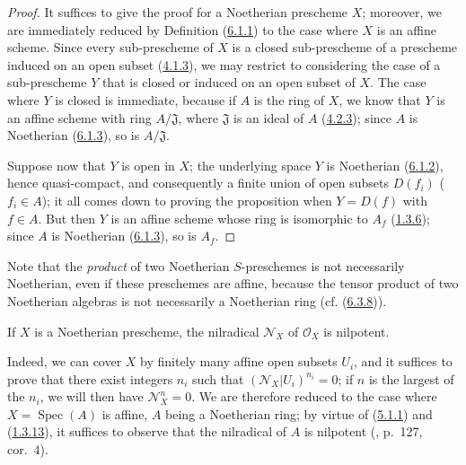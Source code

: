 \begin{proof}
It suffices to give the proof for a Noetherian prescheme $X$; moreover,
we are immediately reduced by Definition
(\hyperref[I.6.1.1]{6.1.1}) to the case where $X$ is an affine scheme.
Since every sub-prescheme of $X$ is a closed sub-prescheme of a prescheme
induced on an open subset (\hyperref[I.4.1.3]{4.1.3}), we may restrict to
considering the case of a sub-prescheme $Y$ that is closed or induced on an
open subset of $X$. The case where $Y$ is closed is immediate, because if $A$
is the ring of $X$, we know that $Y$ is an affine scheme with ring
$A/\mathfrak{J}$, where $\mathfrak{J}$ is an ideal of $A$
(\hyperref[I.4.2.3]{4.2.3}); since $A$ is Noetherian
(\hyperref[I.6.1.3]{6.1.3}), so is $A/\mathfrak{J}$.

Suppose now that $Y$ is open in $X$; the underlying space $Y$ is
Noetherian (\hyperref[I.6.1.2]{6.1.2}), hence quasi-compact, and
consequently a finite union of open subsets $D(f_i)$ ($f_i\in A$);
it all comes down to proving the proposition when $Y=D(f)$ with $f\in A$. But
then $Y$ is an affine scheme whose ring is isomorphic to $A_f$
(\hyperref[I.1.3.6]{1.3.6}); since $A$ is Noetherian
(\hyperref[I.6.1.3]{6.1.3}), so is $A_f$.
\end{proof}

\begin{env}[6.1.5]
\label{I.6.1.5}
Note that the \emph{product} of two Noetherian $S$-preschemes is not
necessarily Noetherian, even if these preschemes are affine, because the
tensor product of two Noetherian algebras is not necessarily a Noetherian
ring (cf. (\hyperref[I.6.3.8]{6.3.8})).
\end{env}

\begin{proposition}[6.1.6]
\label{I.6.1.6}
If $X$ is a Noetherian prescheme, the nilradical $\mathscr{N}_X$ of
$\mathscr{O}_X$ is nilpotent.
\end{proposition}

Indeed, we can cover $X$ by finitely many affine open subsets $U_i$, and it
suffices to prove that there exist integers $n_i$ such that
$(\mathscr{N}_X|U_i)^{n_i}=0$; if $n$ is the largest of the $n_i$, we will
then have $\mathscr{N}_X^n=0$. We are therefore reduced to the case where
$X=\operatorname{Spec}(A)$ is affine, $A$ being a Noetherian ring; by
virtue of (\hyperref[I.5.1.1]{5.1.1}) and
(\hyperref[I.1.3.13]{1.3.13}), it suffices to observe that the nilradical
of $A$ is nilpotent (\cite{I-11}, p.~127, cor.~4).

